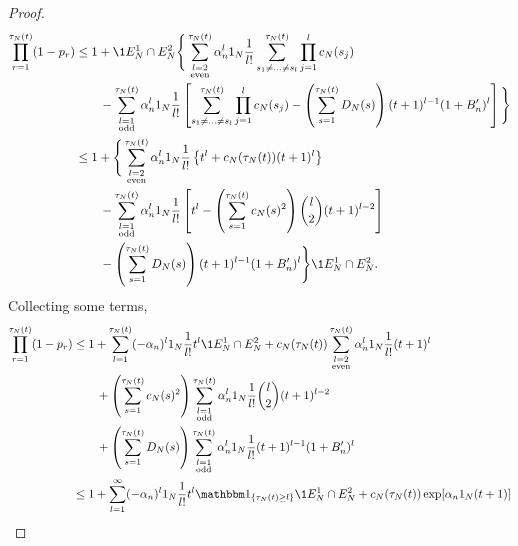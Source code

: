 \begin{proof}
\begin{align*}
\prod_{r=1}^{\tau_N(t)} (1-p_r)
&\leq 1 + \1{E_N^1 \cap E_N^2} \Bigg\{ 
        \sum_{\substack{l=2 \\ \text{even} }}^{\tau_N(t)} 
        \alpha_n^l \ON \frac{1}{l!} 
        \sum_{s_1\neq\dots\neq s_l}^{\tau_N(t)}\prod_{j=1}^l c_N(s_j) \\
    &\qquad- \sum_{\substack{l=1 \\ \text{odd} }}^{\tau_N(t)} 
        \alpha_n^l \ON \frac{1}{l!} 
        \left[ \sum_{s_1\neq\dots\neq s_l}^{\tau_N(t)}\prod_{j=1}^l c_N(s_j)
        - \left( \sum_{s=1}^{\tau_N(t)} D_N(s) \right) 
        (t+1)^{l-1} (1+B_n^\prime)^l \right] \Bigg\} \\
&\leq 1 + \Bigg\{ \sum_{\substack{l=2 \\ \text{even} }}^{\tau_N(t)} 
        \alpha_n^l \ON \frac{1}{l!} 
        \left\{ t^l + c_N(\tau_N(t)) (t+1)^l \right\} \\
    &\qquad- \sum_{\substack{l=1 \\ \text{odd} }}^{\tau_N(t)} 
        \alpha_n^l \ON \frac{1}{l!} 
        \left[ t^l - \left( \sum_{s=1}^{\tau_N(t)} c_N(s)^2 \right) 
        \binom{l}{2} (t+1)^{l-2} \right] \\
    &\qquad- \left( \sum_{s=1}^{\tau_N(t)} D_N(s) \right) 
        (t+1)^{l-1} (1+B_n^\prime)^l \Bigg\} \1{E_N^1 \cap E_N^2} .
\end{align*}
Collecting some terms,
\begin{align}
\prod_{r=1}^{\tau_N(t)} (1-p_r)
&\leq 1+ \sum_{l=1}^{\tau_N(t)} (-\alpha_n)^l \ON \frac{1}{l!} t^l 
        \1{E_N^1 \cap E_N^2}
        + c_N(\tau_N(t)) \sum_{\substack{l=2 \\ \text{even} }}^{\tau_N(t)}
        \alpha_n^l \ON \frac{1}{l!} (t+1)^l \notag\\
    &\qquad+ \left( \sum_{s=1}^{\tau_N(t)} c_N(s)^2 \right)
        \sum_{\substack{l=1 \\ \text{odd} }}^{\tau_N(t)} \alpha_n^l
        \ON \frac{1}{l!} \binom{l}{2} (t+1)^{l-2} \notag\\
    &\qquad+ \left( \sum_{s=1}^{\tau_N(t)} D_N(s) \right) 
        \sum_{\substack{l=1 \\ \text{odd} }}^{\tau_N(t)} \alpha_n^l
        \ON \frac{1}{l!} (t+1)^{l-1} (1+B_n^\prime)^l \notag\\
&\leq 1+ \sum_{l=1}^{\infty} (-\alpha_n)^l \ON \frac{1}{l!} t^l
        \I{\tau_N(t) \geq l} \1{E_N^1 \cap E_N^2}
        + c_N(\tau_N(t)) \exp[ \alpha_n \ON (t+1) ] \notag\\

\end{align}
\end{proof}
